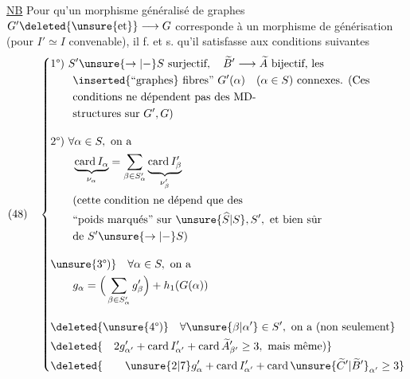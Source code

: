 \uline{NB} Pour qu'un morphisme généralisé de graphes $G'\deleted{\unsure{\text{et}}}\longrightarrow G$ corresponde à un morphisme de générisation (pour $I'\simeq I$ convenable), il f. et s. qu'il satisfasse aux conditions suivantes
\[
(48)\quad\left\{\begin{aligned}
&\text{1°) }S'\unsure{\to|{-}}S\text{ surjectif},\quad\widetilde B'\longrightarrow\widetilde A\text{ bijectif, les}\\
&\qquad\inserted{\text{``graphes}}\text{ fibres'' }G'(\alpha)\quad(\alpha\in S)\text{ connexes. (Ces}\\
&\qquad\text{conditions ne dépendent pas des MD-}\\
&\qquad\text{structures sur }G',G\text{)}\\[1em]
&\text{2°) }\forall\alpha\in S,\text{ on a}\\
&\qquad\underbrace{\operatorname{card}I_\alpha}_{\nu_\alpha}=\sum_{\beta\in S'_\alpha}\underbrace{\operatorname{card}I'_\beta}_{\nu'_\beta}\\
&\qquad\text{(cette condition ne dépend que des}\\
&\qquad\text{``poids marqués'' sur }\unsure{\widehat S|S},S',\text{ et bien sûr}\\
&\qquad\text{de }S'\unsure{\to|{-}}S\text{)}\\[1em]
&\unsure{\text{3°)}}\quad\forall\alpha\in S,\text{ on a}\\
&\qquad g_\alpha=\Big(\sum_{\beta\in S'_\alpha}g'_\beta\Big)+h_1(G(\alpha))\\[1em]
&\deleted{\unsure{\text{4°)}}\quad\forall\unsure{\beta|\alpha'}\in S',\text{ on a (non seulement}}\\
&\deleted{\quad2g'_{\alpha'}+\operatorname{card}I'_{\alpha'}+\operatorname{card}\widetilde A'_{\beta'}\geq3,\text{ mais même)}}\\
&\deleted{\qquad\unsure{2|7}g'_{\alpha}+\operatorname{card}I'_{\alpha'}+\operatorname{card}\unsure{\widetilde C'|\widetilde B'}_{\alpha'}\geq3}
\end{aligned}\right.
\]
